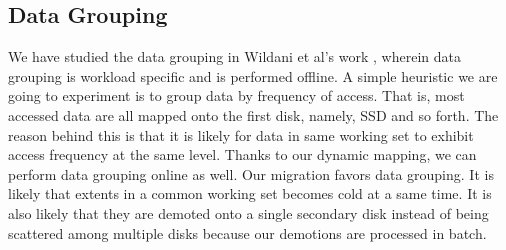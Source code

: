 \subsection{Data Grouping}

We have studied the data grouping in Wildani et al's work
\cite{Wildani_grouping}, wherein data grouping is workload specific
and is performed offline. A simple heuristic we are going to
experiment is to group data by frequency of access. That is, most
accessed data are all mapped onto the first disk, namely, SSD and so
forth. The reason behind this is that it is likely for data in same
working set to exhibit access frequency at the same level.  Thanks to
our dynamic mapping, we can perform data grouping online as well. Our
migration favors data grouping.  It is likely that extents in a common
working set becomes cold at a same time. It is also likely that they
are demoted onto a single secondary disk instead of being scattered
among multiple disks because our demotions are processed in batch. 

